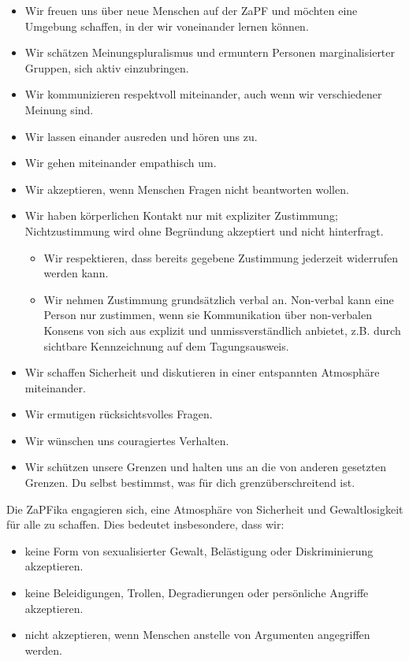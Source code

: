 \documentclass[
  a4paper,
  oneside]{scrartcl}
\providecommand{\tightlist}{%
  \setlength{\itemsep}{0pt}\setlength{\parskip}{0pt}}
\begin{document}
\begin{itemize}
\tightlist
\item
  Wir freuen uns über neue Menschen auf der ZaPF und möchten eine
  Umgebung schaffen, in der wir voneinander lernen können.
\item
  Wir schätzen Meinungspluralismus und ermuntern Personen
  marginalisierter Gruppen, sich aktiv einzubringen.
\item
  Wir kommunizieren respektvoll miteinander, auch wenn wir verschiedener
  Meinung sind.
\item
  Wir lassen einander ausreden und hören uns zu.
\item
  Wir gehen miteinander empathisch um.
\item
  Wir akzeptieren, wenn Menschen Fragen nicht beantworten wollen.
\item
  Wir haben körperlichen Kontakt nur mit expliziter Zustimmung;
  Nichtzustimmung wird ohne Begründung akzeptiert und nicht hinterfragt.

  \begin{itemize}
  \tightlist
  \item
    Wir respektieren, dass bereits gegebene Zustimmung jederzeit
    widerrufen werden kann.
  \item
    Wir nehmen Zustimmung grundsätzlich verbal an. Non-verbal kann eine
    Person nur zustimmen, wenn sie Kommunikation über non-verbalen
    Konsens von sich aus explizit und unmissverständlich anbietet, z.B.
    durch sichtbare Kennzeichnung auf dem Tagungsausweis.
  \end{itemize}
\item
  Wir schaffen Sicherheit und diskutieren in einer entspannten
  Atmosphäre miteinander.
\item
  Wir ermutigen rücksichtsvolles Fragen.
\item
  Wir wünschen uns couragiertes Verhalten.
\item
  Wir schützen unsere Grenzen und halten uns an die von anderen
  gesetzten Grenzen. Du selbst bestimmst, was für dich
  grenzüberschreitend ist.
\end{itemize}

Die ZaPFika engagieren sich, eine Atmosphäre von Sicherheit und
Gewaltlosigkeit für alle zu schaffen. Dies bedeutet insbesondere, dass
wir:

\begin{itemize}
\tightlist
\item
  keine Form von sexualisierter Gewalt, Belästigung oder Diskriminierung
  akzeptieren.
\item
  keine Beleidigungen, Trollen, Degradierungen oder persönliche Angriffe
  akzeptieren.
\item
  nicht akzeptieren, wenn Menschen anstelle von Argumenten angegriffen
  werden.
\end{itemize}
\end{document}
